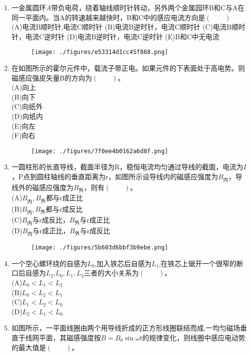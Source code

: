 \begin{enumerate}
\begin{figure}[ht]
\caption{} \label{fig_HSD15_6}
\end{figure}
\item 一金属圆环$A$带负电荷，绕着轴线顺时针转动，另外两个金属园环B和C与A在同一平面内。当A的转速越来越快时，B和C中的感应电流方向是$(\qquad)$\\
(A)电流B顺时针,电流C顺时针
(B)电流B逆时针，电流C顺时针
(C)电流B顺时针，电流C逆时针
(D)电流B逆时针，电流C逆时针
(E)B和C中无电流
\begin{figure}[ht]
\centering
\texttt{[image: ./figures/e53314d1cc45f868.png]}
\caption{} \label{fig_HSD15_7}
\end{figure}
\item 在如图所示的霍尔元件中，载流子带正电。如果元件的下表面处于高电势。则磁感应强皮矢量B的方向为$(\qquad)$。\\
(A)向上\\
(B)向下\\
(C)向纸外\\
(D)向纸内\\
(E)向左\\
(F)向右
\begin{figure}[ht]
\centering
\texttt{[image: ./figures/7f0ee4b0162a6d8f.png]}
\caption{} \label{fig_HSD15_8}
\end{figure}
\item 一圆柱形的长直导线，截面半径为R，稳恒电流均匀通过导线的截面，电流为$I$，P点到圆柱轴线的垂直距离为r，如图所示设导线内的磁感应强度为$B_\text{内}$，导线外的磁感应强度为$B_\text{外}$，则有$(\qquad)$。\\
(A)$B_\text{内},B_\text{外}$都与r成正比\\
(B)$B_\text{内},B_\text{外}$都与r成反比\\
(C)$B_\text{内}$与r成反比，$B_\text{外}$与r成正比\\
(D)$B_\text{内}$与r成正比，$B_\text{外}$与r成反比
\begin{figure}[ht]
\centering
\texttt{[image: ./figures/5b603d6bbf3b9ebe.png]}
\caption{} \label{fig_HSD15_9}
\end{figure}
\item 一个空心螺环绕的自感为$L_0$,加入铁芯后自感为$L_1$,在铁芯上锯开一个很窄的断口后自感为$L_2$,$L_0,L_1,L_2$三者的大小关系为$(\qquad)$。\\
(A)$L_0<L_1<L_2$\\
(B)$L_0<L_2<L_1$\\
(C)$L_1<L_2<L_0$\\
(D)$L_2<L_1<L_0$
\item 如图所示，一平面线圈由两个用导线折成的正方形线圈联结而成.一均匀磁场垂直于线网平面，其磁感强度按$B=B_0\sin \omega t$的规律变化，则线圈中感应电动势的最大值是$(\qquad)$。

\end{enumerate}

